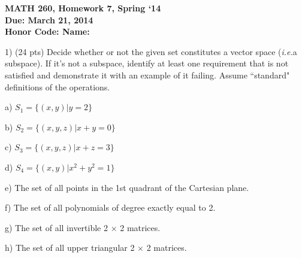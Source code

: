 \documentclass{article}
\begin{document}
\begin{flushleft}
	\bfseries{MATH 260, Homework 7, Spring `14}\\
	\bfseries{Due: March 21, 2014}\\
	\bfseries{Honor Code:} \hspace{3.5in}\bfseries{Name:}\\
\end{flushleft}
\begin{flushleft}
\vspace{.25in}

1) (24 pts) Decide whether or not the given set constitutes a vector space (\emph{i.e.}a subspace).  If it's not a subspace, identify at least one requirement that is not satisfied and demonstrate it with an example of it failing.  Assume ``standard" definitions of the operations.  

\vspace{0.2in}

a) $S_1 = \{(x,y)| y = 2\}$

\vspace{1.5in}

b) $S_2 = \{(x,y,z)| x + y = 0\}$

\vspace{1.5in}

c) $S_3 = \{(x,y,z)| x + z = 3\}$

\vspace{1.5in}

d) $S_4 = \{(x,y)| x^2 + y^2 = 1\}$

\pagebreak

e) The set of all points in the 1st quadrant of the Cartesian plane.

\vspace{1.5in}

f) The set of all polynomials of degree exactly equal to 2.

\vspace{1.5in}

g) The set of all invertible 2 $\times$ 2 matrices.

\vspace{1.5in}

h) The set of all upper triangular 2 $\times$ 2 matrices.

\end{flushleft}
\end{document}
